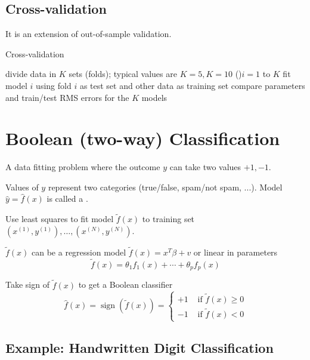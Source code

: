 \subsection{Cross-validation}

It is an extension of out-of-sample validation.

\begin{algorithm}[htbp]
    \caption{Cross-validation}
    divide data in $ K $ sets (folds); typical values are $ K=5, K=10 $\;
    \For(){$ i=1 $ to $ K $}{
        fit model $ i $ using fold $ i $ as test set and other data as training set\;
        compare parameters and train/test RMS errors for the $ K $ models
    }
\end{algorithm}


\section{Boolean (two-way) Classification}

\begin{problem}
    A data fitting problem where the outcome $ y $ can take two values $ +1,-1 $.

    Values of $ y $ represent two categories (true/false, spam/not spam, ...). Model $ \hat{y}=\hat{f}(x) $ is called a .

\end{problem}

Use least squares to fit model $ \tilde{f}(x) $ to training set $ \left(x^{(1)}, y^{(1)}\right), \ldots,\left(x^{(N)}, y^{(N)}\right) $.

$ \tilde{f}(x) $ can be a regression model $ \tilde{f}(x)=x^{T} \beta+v $ or linear in parameters
\begin{equation}
\tilde{f}(x)=\theta_{1} f_{1}(x)+\cdots+\theta_{p} f_{p}(x)
\end{equation}

Take sign of $ \tilde{f}(x) $ to get a Boolean classifier
\begin{equation}
\hat{f}(x)=\operatorname{sign}(\tilde{f}(x))=\left\{\begin{array}{ll}
+1 & \text { if } \tilde{f}(x) \geq 0 \\
-1 & \text { if } \tilde{f}(x)<0
\end{array}\right.
\end{equation}

\subsection{Example: Handwritten Digit Classification}

